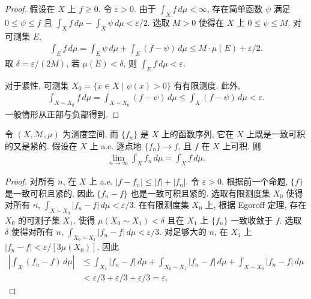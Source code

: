 \documentclass[../../main.tex]{subfiles}
\begin{document}
\begin{proof}
假设在 $X$ 上 $f\geqslant 0$. 令 $\varepsilon>0$. 由于 $\int_{X}f\,d\mu<\infty$, 存在简单函数 $\psi$ 满足 $0\leqslant\psi\leqslant f$ 且 $\int_{X}f\,d\mu-\int_{X}\psi\,d\mu<\varepsilon/2$. 选取 $M>0$ 使得在 $X$ 上 $0\leqslant\psi\leqslant M$. 对可测集 $E$,
\begin{align*}
\int_{E}f\,d\mu=\int_{E}\psi\,d\mu+\int_{E}(f-\psi)\,d\mu\leqslant M\cdot\mu(E)+\varepsilon/2.
\end{align*}
取 $\delta=\varepsilon/(2M)$, 若 $\mu(E)<\delta$, 则 $\int_{E}f\,d\mu<\varepsilon$.

对于紧性, 可测集 $X_{0}=\{x\in X\mid\psi(x)>0\}$ 有有限测度. 此外,
\begin{align*}
\int_{X\sim X_{0}}f\,d\mu=\int_{X\sim X_{0}}(f-\psi)\,d\mu\leqslant\int_{X}(f-\psi)\,d\mu<\varepsilon.
\end{align*}
一般情形从正部与负部得到.
\end{proof}

\begin{theorem}\label{theorem:ch18-vitali}
令 $(X,\mathcal{M},\mu)$ 为测度空间, 而 $\{f_{n}\}$ 是 $X$ 上的函数序列, 它在 $X$ 上既是一致可积的又是紧的. 假设在 $X$ 上 a.e. 逐点地 $\{f_{n}\}\to f$, 且 $f$ 在 $X$ 上可积. 则
\begin{align*}
\lim_{n\to\infty}\int_{X}f_{n}\,d\mu=\int_{X}f\,d\mu.
\end{align*}
\end{theorem}

\begin{proof}
对所有 $n$, 在 $X$ 上 a.e. $|f-f_{n}|\leqslant|f|+|f_{n}|$. 令 $\varepsilon>0$. 根据前一个命题, $\{f\}$ 是一致可积且紧的, 因此 $\{f_{n}-f\}$ 也是一致可积且紧的. 选取有限测度集 $X_{0}$ 使得对所有 $n$, $\int_{X\sim X_{0}}|f_{n}-f|\,d\mu<\varepsilon/3$. 在有限测度集 $X_{0}$ 上, 根据 Egoroff 定理, 存在 $X_{0}$ 的可测子集 $X_{1}$, 使得 $\mu(X_{0}\sim X_{1})<\delta$ 且在 $X_{1}$ 上 $\{f_{n}\}$ 一致收敛于 $f$. 选取 $\delta$ 使得对所有 $n$, $\int_{X_{0}\sim X_{1}}|f_{n}-f|\,d\mu<\varepsilon/3$. 对足够大的 $n$, 在 $X_{1}$ 上 $|f_{n}-f|<\varepsilon/[3\mu(X_{0})]$. 因此
\begin{align*}
\left|\int_{X}(f_{n}-f)\,d\mu\right|&\leqslant\int_{X_{1}}|f_{n}-f|\,d\mu+\int_{X_{0}\sim X_{1}}|f_{n}-f|\,d\mu+\int_{X\sim X_{0}}|f_{n}-f|\,d\mu\\
&<\varepsilon/3+\varepsilon/3+\varepsilon/3=\varepsilon.
\end{align*}
\end{proof}
\end{document}
